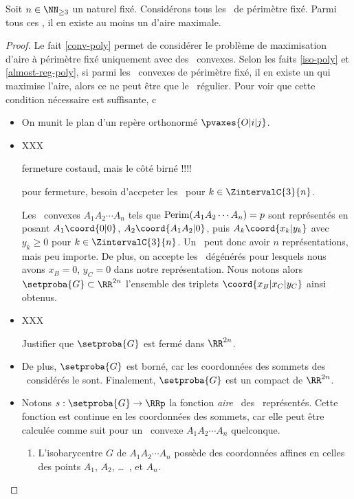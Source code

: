 

\begin{fact} \label{suff-cond}
    Soit $n \in \NN_{\geq3}$ un naturel fixé.
    Considérons tous les \ngones\ de périmètre fixé. Parmi tous ces \ngones, il en existe au moins un d'aire maximale.
\end{fact}


\begin{proof}
    Le fait \ref{conv-poly} permet de considérer le problème de maximisation d'aire à périmètre fixé uniquement avec des \ngones\ convexes.
    Selon les faits \ref{iso-poly} et \ref{almost-reg-poly}, si parmi les \ngones\ convexes de périmètre fixé, il en existe un qui maximise l'aire, alors ce ne peut être que le \ngone\ régulier.
    Pour voir que cette condition nécessaire est suffisante, c
    \begin{itemize}
        \item On munit le plan d'un repère orthonormé $\pvaxes{O | i | j}$. 

        \item 
        XXX
        
        fermeture costaud, mais le côté birné !!!!
        
        pour fermeture, besoin d'accpeter les \kgones\ pour $k \in \ZintervalC{3}{n}$.
        
        Les \ngones\ convexes $A_1 A_2 \cdots A_n$ tels que $\mathrm{Perim}(A_1 A_2 \cdots A_n) = p$ sont représentés en posant $A_1\coord{0 | 0}$, $A_2\coord{A_1 A_2 | 0}$, puis $A_k\coord{x_k | y_k}$ avec $y_k \geq 0$ pour $k \in \ZintervalC{3}{n}$. Un \ngone\ peut donc avoir $n$ représentations, mais peu importe.
        De plus, on accepte les \ngones\ dégénérés pour lesquels nous avons $x_B = 0$, $y_C = 0$ dans notre représentation.
        Nous notons alors $\setproba{G} \subset \RR^{2n}$ l'ensemble des triplets $\coord{x_B | x_C | y_C}$ ainsi obtenus.

        \item XXX
        
        Justifier que $\setproba{G}$ est fermé dans $\RR^{2n}$.






        \item De plus, $\setproba{G}$ est borné, car les coordonnées des sommets des \kgones\ considérés le sont.        
        Finalement, $\setproba{G}$ est un compact de $\RR^{2n}$.


        \item Notons $s: \setproba{G} \rightarrow \RRp$ la fonction \og \emph{aire} \fg\ des \ngones\ représentés. 
        Cette fonction est continue en les coordonnées des sommets, car elle peut être calculée comme suit pour un \ngone\ convexe $A_1 A_2 \cdots A_n$ quelconque.
        \begin{enumerate}
            \item L'isobarycentre $G$ de $A_1 A_2 \cdots A_n$ possède des coordonnées affines en celles des points $A_1$, $A_2$, \dots\ , et $A_n$.


\end{enumerate}
\end{itemize}
\end{proof}
